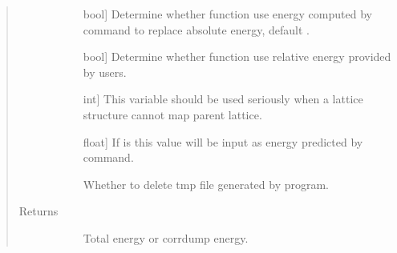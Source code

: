 \documentclass[letterpaper,10pt,english]{sphinxmanual}
\begin{document}
\begin{fulllineitems}
\begin{fulllineitems}
\begin{quote}
\begin{description}
\begin{description}
\item[{}] \leavevmode{[}bool{]}
Determine whether function use energy computed by 
command to replace absolute energy, default .

\item[{}] \leavevmode{[}bool{]}
Determine whether function use relative energy provided by users.

\item[{}] \leavevmode{[}int{]}
This variable should be used seriously when a lattice structure
cannot map parent lattice.

\item[{}] \leavevmode{[}float{]}
If  is  this value will be input as energy predicted
by  command.

\item[{}] \leavevmode
Whether to delete tmp file generated by program.

\end{description}

\item[{Returns}] \leavevmode\begin{description}
\item[{}] \leavevmode
Total energy or corrdump energy.

\end{description}

\end{description}\end{quote}

\end{fulllineitems}


\begin{fulllineitems}
\label{\detokenize{pygace:pygace.ce.CE.make_template}}~
\end{fulllineitems}



\end{fulllineitems}
\end{document}
